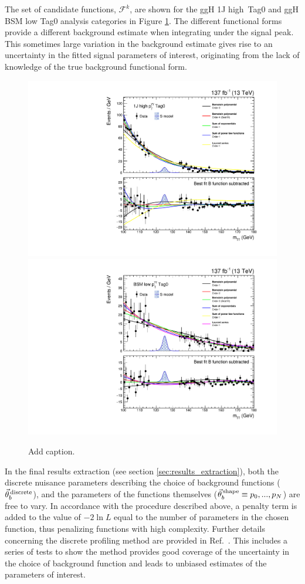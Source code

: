 The set of candidate functions, $\mathcal{F}^k$, are shown for the ggH 1J high~\ptgg Tag0 and ggH BSM low \ptgg Tag0 analysis categories in Figure \ref{fig:bkgmodels_category}. The different functional forms provide a different background estimate when integrating under the signal peak. This sometimes large variation in the background estimate gives rise to an uncertainty in the fitted signal parameters of interest, originating from the lack of knowledge of the true background functional form.

\begin{figure}[hptb]
  \centering
  \includegraphics[width=.49\textwidth]{Figures/hgg_stats/bmodel_RECO_1J_PTH_120_200_Tag0.pdf}
  \hfill
  \includegraphics[width=.49\textwidth]{Figures/hgg_stats/bmodel_RECO_PTH_200_300_Tag0.pdf}
  \caption[Signal models for the 0J low \ptH Tag0 and qqH VH-like Tag0 categories]
  {
    Add caption.
  }
  \label{fig:bkgmodels_category}
\end{figure}

In the final results extraction (see section \ref{sec:results_extraction}), both the discrete nuisance parameters describing the choice of background functions ($\vec{\theta}^{\,\rm{discrete}}_{b}$), and the parameters of the functions themselves ($\vec{\theta}^{\,\rm{shape}}_{b} \equiv p_0,...,p_N$) are free to vary. In accordance with the procedure described above, a penalty term is added to the value of $-2\ln{L}$ equal to the number of parameters in the chosen function, thus penalizing functions with high complexity. Further details concerning the discrete profiling method are provided in Ref.~\cite{Dauncey:2014xga}. This includes a series of tests to show the method provides good coverage of the uncertainty in the choice of background function and leads to unbiased estimates of the parameters of interest.

